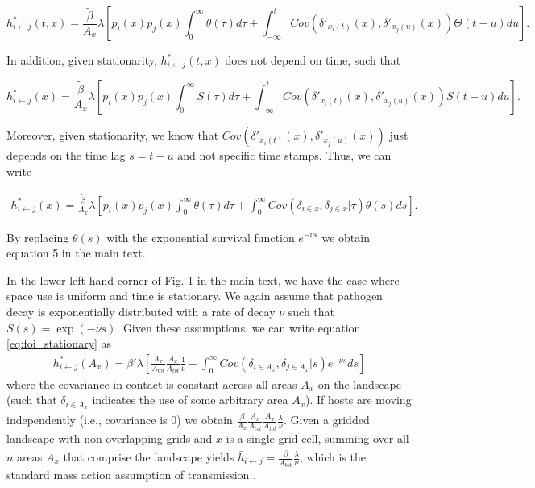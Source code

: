 \documentclass[11pt]{article}
\begin{document}
$$
h^*_{i \leftarrow j}(t, x) = \frac{\tilde{\beta}}{A_x} \lambda \left[p_i(x) p_j(x) \int_0^\infty \theta(\tau) d\tau  + \int_{-\infty}^t Cov(\delta'_{x_i(t)}(x), \delta'_{x_j(u)}(x)) \Theta(t - u) du\right].
$$

In addition, given stationarity, $h^*_{i \leftarrow j}(t, x)$ does not depend on time, such that 

$$
h^*_{i \leftarrow j}(x) = \frac{\tilde{\beta}}{A_x} \lambda \left[p_i(x) p_j(x) \int_0^\infty S(\tau) d\tau  + \int_{-\infty}^t Cov(\delta'_{x_i(t)}(x), \delta'_{x_j(u)}(x)) S(t - u) du\right].
$$

Moreover, given stationarity, we know that $Cov(\delta'_{x_i(t)}(x), \delta'_{x_j(u)}(x))$ just depends on the time lag $s = t - u$ and not specific time stamps. Thus, we can write

\begin{equation}
    \begin{aligned}
   h^*_{i \leftarrow j}(x) = \frac{\tilde{\beta}}{A_x} \lambda \left[p_i(x)p_j(x) \int_0^\infty \theta(\tau) d\tau + \int_{0}^{\infty} Cov(\delta_{i \in x}, \delta_{j \in x} | \tau) \theta(s) ds\right].
    \end{aligned}
    \label{eq:foi_stationary}
\end{equation}

By replacing $\theta(s)$ with the exponential survival function $e^{-\nu s}$ we obtain equation 5 in the main text.

In the lower left-hand corner of Fig. 1 in the main text, we have the case where space use is uniform and time is stationary. We again assume that pathogen decay is exponentially distributed with a rate of decay $\nu$ such that $S(s) = \exp(-\nu s)$. Given these assumptions, we can write equation \ref{eq:foi_stationary} as
\begin{equation}
    \begin{aligned}
        h^*_{i \leftarrow j}(A_x) = \beta' \lambda \left[\frac{A_x}{A_{tot}}\frac{A_x}{A_{tot}} \frac{1}{\nu} +  \int_{0}^{\infty} Cov(\delta_{i \in A_x}, \delta_{j \in A_x} | s) e^{-\nu s} ds\right]
    \end{aligned}
    \label{eq:uniform_stationary1}
\end{equation}
where the covariance in contact is constant across all areas $A_x$ on the landscape (such that $\delta_{i \in A_x}$ indicates the use of some arbitrary area $A_x$).  
If hosts are moving independently (i.e., covariance is 0) we obtain $\frac{\tilde{\beta}}{A_x} \frac{A_x}{A_{tot}} \frac{A_x}{A_{tot}}  \frac{\lambda}{\nu}$. Given a gridded landscape with non-overlapping grids and $x$ is a single grid cell, summing over all $n$ areas $A_x$ that comprise the landscape yields $\bar{h}_{i \leftarrow j} =\frac{\tilde{\beta}}{A_\text{tot}} \frac{\lambda}{\nu}$, which is the standard mass action assumption of transmission \citep{McCallum2001}. 
\end{document}
